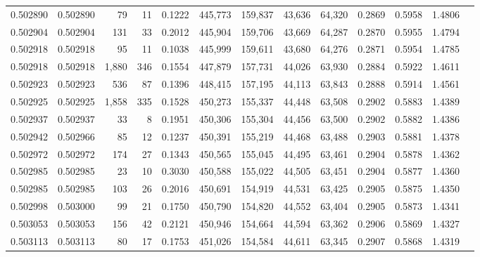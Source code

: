 \begin{tabular}{rrrrrrrrrrrrr}
0.502890 & 0.502890 &    79 &    11 &                                     0.1222 & 445,773 & 159,837 &  43,636 &  64,320 & 0.2869 & 0.5958 & 1.4806 \\
0.502904 & 0.502904 &   131 &    33 &                                     0.2012 & 445,904 & 159,706 &  43,669 &  64,287 & 0.2870 & 0.5955 & 1.4794 \\
0.502918 & 0.502918 &    95 &    11 &                                     0.1038 & 445,999 & 159,611 &  43,680 &  64,276 & 0.2871 & 0.5954 & 1.4785 \\
0.502918 & 0.502918 & 1,880 &   346 &                                     0.1554 & 447,879 & 157,731 &  44,026 &  63,930 & 0.2884 & 0.5922 & 1.4611 \\
0.502923 & 0.502923 &   536 &    87 &                                     0.1396 & 448,415 & 157,195 &  44,113 &  63,843 & 0.2888 & 0.5914 & 1.4561 \\
0.502925 & 0.502925 & 1,858 &   335 &                                     0.1528 & 450,273 & 155,337 &  44,448 &  63,508 & 0.2902 & 0.5883 & 1.4389 \\
0.502937 & 0.502937 &    33 &     8 &                                     0.1951 & 450,306 & 155,304 &  44,456 &  63,500 & 0.2902 & 0.5882 & 1.4386 \\
0.502942 & 0.502966 &    85 &    12 &                                     0.1237 & 450,391 & 155,219 &  44,468 &  63,488 & 0.2903 & 0.5881 & 1.4378 \\
0.502972 & 0.502972 &   174 &    27 &                                     0.1343 & 450,565 & 155,045 &  44,495 &  63,461 & 0.2904 & 0.5878 & 1.4362 \\
0.502985 & 0.502985 &    23 &    10 &                                     0.3030 & 450,588 & 155,022 &  44,505 &  63,451 & 0.2904 & 0.5877 & 1.4360 \\
0.502985 & 0.502985 &   103 &    26 &                                     0.2016 & 450,691 & 154,919 &  44,531 &  63,425 & 0.2905 & 0.5875 & 1.4350 \\
0.502998 & 0.503000 &    99 &    21 &                                     0.1750 & 450,790 & 154,820 &  44,552 &  63,404 & 0.2905 & 0.5873 & 1.4341 \\
0.503053 & 0.503053 &   156 &    42 &                                     0.2121 & 450,946 & 154,664 &  44,594 &  63,362 & 0.2906 & 0.5869 & 1.4327 \\
0.503113 & 0.503113 &    80 &    17 &                                     0.1753 & 451,026 & 154,584 &  44,611 &  63,345 & 0.2907 & 0.5868 & 1.4319 \\

\end{tabular}
